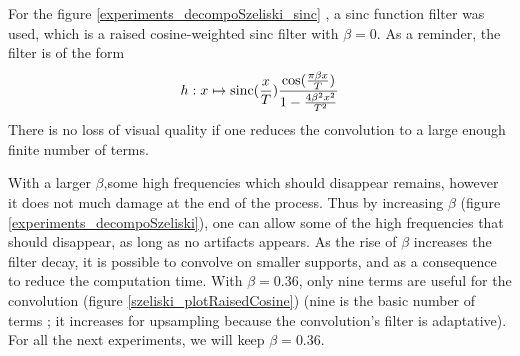 	For the figure \ref{experiments_decompoSzeliski_sinc} , a sinc function filter was used, which is a raised cosine-weighted sinc filter with $\beta = 0$. As a reminder, the filter is of the form
		\[h : x \mapsto \operatorname{sinc}(\frac{x}{T})\frac{\cos(\frac{\pi\beta x}{T})}{1-\frac{4\beta^2x^2}{T^2}}\]
		There is no loss of visual quality if one reduces the convolution to a large enough finite number of terms.
		
	
	
	With a larger $\beta$,some high frequencies which should disappear remains, however it does not much damage at the end of the process. Thus by increasing $\beta$ (figure \ref{experiments_decompoSzeliski}), one can allow some of the high frequencies that should disappear, as long as no artifacts appears. As the rise of $\beta$ increases the filter decay, it is possible to convolve on smaller supports, and as a consequence to reduce the computation time. With $\beta = 0.36$, only nine terms are useful for the convolution (figure \ref{szeliski_plotRaisedCosine}) (nine is the basic number of terms ; it increases for upsampling because the convolution's filter is adaptative). For all the next experiments, we will keep  $\beta = 0.36$. 
	
